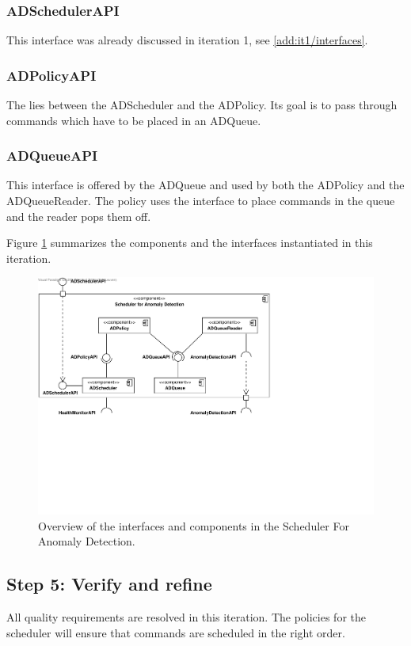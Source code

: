 \subsubsection{ADSchedulerAPI}

\npar This interface was already discussed in iteration 1, see
\ref{add:it1/interfaces}.

\subsubsection{ADPolicyAPI}

\npar The  lies between the ADScheduler and the ADPolicy.
Its goal is to pass through commands which have to be placed in an ADQueue.

\subsubsection{ADQueueAPI}

\npar This interface is offered by the ADQueue and used by both the ADPolicy and
the ADQueueReader. The policy uses the interface to place commands in the queue
and the reader pops them off.

\npar Figure \ref{fig:it5/interfaces} summarizes the components and the
interfaces instantiated in this iteration.

\begin{figure}[H]
	\begin{centering}
		\includegraphics[width=\textwidth]{figs/add-it5-interfaces.pdf}
		\caption{Overview of the interfaces and components in the Scheduler For
		Anomaly Detection.}
		\label{fig:it5/interfaces}
	\end{centering}
\end{figure}

\subsection{Step 5: Verify and refine}
\label{add:it5/verification}

\npar All quality requirements are resolved in this iteration. The policies for
the scheduler will ensure that commands are scheduled in the right order. 
